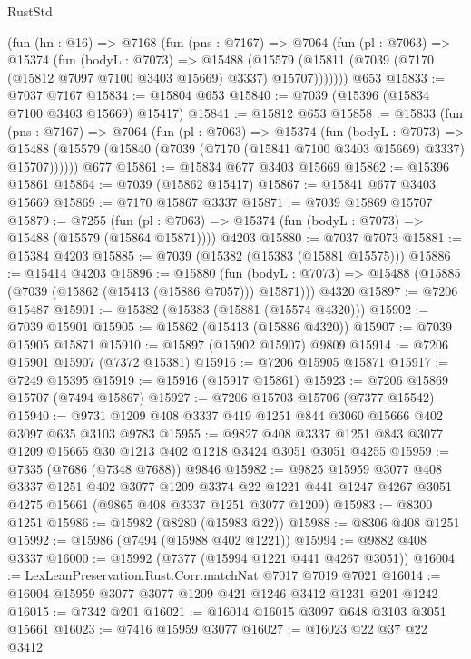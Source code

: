 \begin{lexlean}{RustStd}
\begin{coremodule}
    (fun (hn : @16) =>
    @7168
      (fun (pns : @7167) =>
      @7064
        (fun (pl : @7063) =>
        @15374
          (fun (bodyL : @7073) =>
          @15488
            (@15579 (@15811 (@7039 (@7170 (@15812 @7097 @7100 @3403 @15669) @3337) @15707)))))))
    @653
@15833 := @7037 @7167
@15834 := @15804 @653
@15840 := @7039 (@15396 (@15834 @7100 @3403 @15669) @15417)
@15841 := @15812 @653
@15858 := @15833
    (fun (pns : @7167) =>
    @7064
      (fun (pl : @7063) =>
      @15374
        (fun (bodyL : @7073) =>
        @15488 (@15579 (@15840 (@7039 (@7170 (@15841 @7100 @3403 @15669) @3337) @15707))))))
    @677
@15861 := @15834 @677 @3403 @15669
@15862 := @15396 @15861
@15864 := @7039 (@15862 @15417)
@15867 := @15841 @677 @3403 @15669
@15869 := @7170 @15867 @3337
@15871 := @7039 @15869 @15707
@15879 := @7255
    (fun (pl : @7063) => @15374 (fun (bodyL : @7073) => @15488 (@15579 (@15864 @15871))))
    @4203
@15880 := @7037 @7073
@15881 := @15384 @4203
@15885 := @7039 (@15382 (@15383 (@15881 @15575)))
@15886 := @15414 @4203
@15896 := @15880
    (fun (bodyL : @7073) => @15488 (@15885 (@7039 (@15862 (@15413 (@15886 @7057))) @15871)))
    @4320
@15897 := @7206 @15487
@15901 := @15382 (@15383 (@15881 (@15574 @4320)))
@15902 := @7039 @15901
@15905 := @15862 (@15413 (@15886 @4320))
@15907 := @7039 @15905 @15871
@15910 := @15897 (@15902 @15907) @9809
@15914 := @7206 @15901 @15907 (@7372 @15381)
@15916 := @7206 @15905 @15871
@15917 := @7249 @15395
@15919 := @15916 (@15917 @15861)
@15923 := @7206 @15869 @15707 (@7494 @15867)
@15927 := @7206 @15703 @15706 (@7377 @15542)
@15940 := @9731 @1209 @408 @3337 @419 @1251 @844 @3060 @15666 @402 @3097 @635 @3103 @9783
@15955 := @9827
    @408
    @3337
    @1251
    @843
    @3077
    @1209
    @15665
    @30
    @1213
    @402
    @1218
    @3424
    @3051
    @3051
    @4255
@15959 := @7335 (@7686 (@7348 @7688)) @9846
@15982 := @9825
    @15959
    @3077
    @408
    @3337
    @1251
    @402
    @3077
    @1209
    @3374
    @22
    @1221
    @441
    @1247
    @4267
    @3051
    @4275
    @15661
    (@9865 @408 @3337 @1251 @3077 @1209)
@15983 := @8300 @1251
@15986 := @15982 (@8280 (@15983 @22))
@15988 := @8306 @408 @1251
@15992 := @15986 (@7494 (@15988 @402 @1221))
@15994 := @9882 @408 @3337
@16000 := @15992 (@7377 (@15994 @1221 @441 @4267 @3051))
@16004 := LexLeanPreservation.Rust.Corr.matchNat @7017 @7019 @7021
@16014 := @16004 @15959 @3077 @3077 @1209 @421 @1246 @3412 @1231 @201 @1242
@16015 := @7342 @201
@16021 := @16014 @16015 @3097 @648 @3103 @3051 @15661
@16023 := @7416 @15959 @3077
@16027 := @16023 @22 @37 @22 @3412

\end{coremodule}
\end{lexlean}
